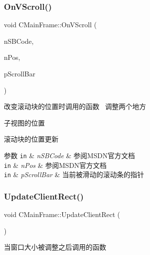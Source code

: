 \subsubsection{\texorpdfstring{On\+V\+Scroll()}{OnVScroll()}}
{\footnotesize\ttfamily void C\+Main\+Frame\+::\+On\+V\+Scroll (\begin{DoxyParamCaption}\item[{U\+I\+NT}]{n\+S\+B\+Code,  }\item[{U\+I\+NT}]{n\+Pos,  }\item[{C\+Scroll\+Bar $\ast$}]{p\+Scroll\+Bar }\end{DoxyParamCaption})}



改变滚动块的位置时调用的函数~\newline
调整两个地方~\newline



\begin{DoxyItemize}
\item 子视图的位置
\item 滚动块的位置更新 
\begin{DoxyParams}[1]{参数}
\mbox{\tt in}  & {\em n\+S\+B\+Code} & 参阅\+M\+S\+D\+N官方文档 \\
\hline
\mbox{\tt in}  & {\em n\+Pos} & 参阅\+M\+S\+D\+N官方文档 \\
\hline
\mbox{\tt in}  & {\em p\+Scroll\+Bar} & 当前被滑动的滚动条的指针 \\
\hline
\end{DoxyParams}

\end{DoxyItemize}\mbox{\label{class_c_main_frame_a2500e3a6ace77e01430f5ff4b9a6f182}} 
\subsubsection{\texorpdfstring{Update\+Client\+Rect()}{UpdateClientRect()}}
{\footnotesize\ttfamily void C\+Main\+Frame\+::\+Update\+Client\+Rect (\begin{DoxyParamCaption}{ }\end{DoxyParamCaption})}



当窗口大小被调整之后调用的函数~\newline



